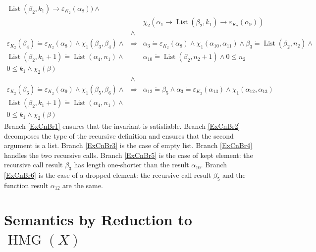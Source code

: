 \documentclass{article}
\newcommand{\tmop}[1]{\ensuremath{\operatorname{#1}}}
\begin{document}
\begin{example}
\begin{eqnarray}
    \tmop{List} (\beta_2, k_1) \rightarrow \varepsilon_{K_2} (\alpha_8))
    \wedge \nonumber\\
    &  & \chi_2 (\alpha_1 \rightarrow \tmop{List} (\beta_2, k_1) \rightarrow
    \varepsilon_{K_2} (\alpha_9)) \nonumber\\
    & \wedge &  \nonumber\\
    \varepsilon_{K_2} (\beta_4) \dot{=} \varepsilon_{K_2} (\alpha_8) \wedge
    \chi_1 (\beta_3, \beta_4) \wedge & \Longrightarrow & \alpha_3 \dot{=}
    \varepsilon_{K_2} (\alpha_8) \wedge \chi_1 (\alpha_{10}, \alpha_{11})
    \wedge \beta_3 \dot{=} \tmop{List} (\beta_2, n_2) \wedge \nonumber\\
    \tmop{List} (\beta_2, k_1 + 1) \dot{=} \tmop{List} (\alpha_4, n_1) \wedge
    &  & \alpha_{10} \dot{=} \tmop{List} (\beta_2, n_2 + 1) \wedge 0 \leq n_2 
    \label{ExCnBr5}\\
    0 \leq k_1 \wedge \chi_2 (\beta) &  &  \nonumber\\
    & \wedge &  \nonumber\\
    \varepsilon_{K_2} (\beta_6) \dot{=} \varepsilon_{K_2} (\alpha_9) \wedge
    \chi_1 (\beta_5, \beta_6) \wedge & \Longrightarrow & \alpha_{12} \dot{=}
    \beta_5 \wedge \alpha_3 \dot{=} \varepsilon_{K_2} (\alpha_{13}) \wedge
    \chi_1 (\alpha_{12}, \alpha_{13})  \label{ExCnBr6}\\
    \tmop{List} (\beta_2, k_1 + 1) \dot{=} \tmop{List} (\alpha_4, n_1) \wedge
    &  &  \nonumber\\
    0 \leq k_1 \wedge \chi_2 (\beta) &  &  \nonumber
  \end{eqnarray}
  Branch \ref{ExCnBr1} ensures that the invariant is satisfiable. Branch
  \ref{ExCnBr2} decomposes the type of the recursive definition and ensures
  that the second argument is a list. Branch \ref{ExCnBr3} is the case of
  empty list. Branch \ref{ExCnBr4} handles the two recursive calls. Branch
  \ref{ExCnBr5} is the case of kept element: the recursive call result
  $\beta_3$ has length one-shorter than the result $\alpha_{10}$. Branch
  \ref{ExCnBr6} is the case of a dropped element: the recursive call result
  $\beta_5$ and the function result $\alpha_{12}$ are the same.
\end{example}

\section{Semantics by Reduction to $\tmop{HMG} (X)$}
\end{document}
